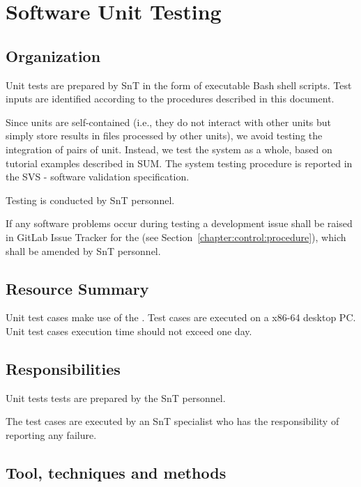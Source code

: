 
\chapter{Software Unit Testing}

\section{Organization}
\label{sec:SUTSIT:org}

Unit tests are prepared by SnT in the form of executable Bash shell scripts. Test inputs are identified according to the procedures described in this document.

Since units are self-contained (i.e., they do not interact with other units but simply store results in files processed by other units), we avoid testing the integration of pairs of unit. Instead, we test the system as a whole, based on tutorial examples described in SUM. The system testing procedure is reported in the SVS - software validation specification.

Testing is conducted by SnT personnel.

If any software problems occur during testing a development issue shall be raised in GitLab Issue Tracker for the \FAQAS (see Section~\ref{chapter:control:procedure}), which shall be amended by SnT personnel.



\section{Resource Summary}

Unit test cases make use of the \FAQAS. Test cases are executed on a x86-64 desktop PC. Unit test cases execution time should not exceed one day.

\section{Responsibilities}

Unit tests tests are prepared by the SnT personnel.

The test cases are executed by an SnT specialist who has the responsibility of reporting any failure.

\section{Tool, techniques and methods}

